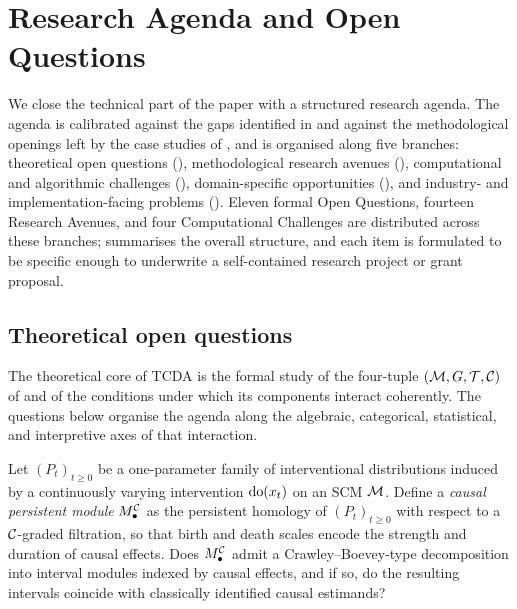 \section{Research Agenda and Open Questions}\label{sec:research}

We close the technical part of the paper with a structured research
agenda. The agenda is calibrated against the gaps identified in
 and against the methodological openings left by the
case studies of , and is organised along five
branches: theoretical open questions (),
methodological research avenues (),
computational and algorithmic challenges
(), domain-specific opportunities
(), and industry- and implementation-facing
problems (). Eleven formal Open Questions,
fourteen Research Avenues, and four Computational Challenges are
distributed across these branches; 
summarises the overall structure, and each item is formulated to be
specific enough to underwrite a self-contained research project or
grant proposal.

\subsection{Theoretical open questions}\label{sec:research_theory}

The theoretical core of TCDA is the formal study of the four-tuple
$(\mathcal{M}, G, \mathcal{T}, \mathcal{C})$ of  and of the conditions under
which its components interact coherently. The questions below organise
the agenda along the algebraic, categorical, statistical, and
interpretive axes of that interaction.

\begin{question}\label{q:causal-modules}
Let $(P_t)_{t \ge 0}$ be a one-parameter family of interventional
distributions induced by a continuously varying intervention $\mathrm{do}(x_t)$
on an SCM $\mathcal{M}$. Define a \emph{causal persistent module}
$M^{\mathcal{C}}_\bullet$ as the persistent homology of $(P_t)_{t \ge 0}$ with
respect to a $\mathcal{C}$-graded filtration, so that birth and death scales
encode the strength and duration of causal effects. Does
$M^{\mathcal{C}}_\bullet$ admit a Crawley--Boevey-type decomposition into
interval modules indexed by causal effects, and if so, do the resulting
intervals coincide with classically identified causal estimands?
\end{question}

